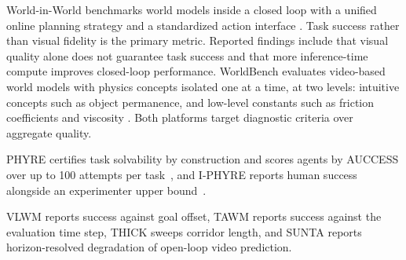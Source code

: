  World-in-World benchmarks world models inside a closed loop with a unified online planning strategy and a standardized action interface \citep{zhang2026worldinworld}. Task success rather than visual fidelity is the primary metric. Reported findings include that visual quality alone does not guarantee task success and that more inference-time compute improves closed-loop performance. WorldBench evaluates video-based world models with physics concepts isolated one at a time, at two levels: intuitive concepts such as object permanence, and low-level constants such as friction coefficients and viscosity \citep{upadhyay2026worldbench}. Both platforms target diagnostic criteria over aggregate quality. 

PHYRE certifies task solvability by construction and scores agents by AUCCESS over up to 100 attempts per task~\citep{bakhtin2019phyre}, and I-PHYRE reports human success alongside an experimenter upper bound~\citep{li2024iphyre}. 

 VLWM reports success against goal offset, TAWM reports success against the evaluation time step, THICK sweeps corridor length, and SUNTA reports horizon-resolved degradation of open-loop video prediction. 
